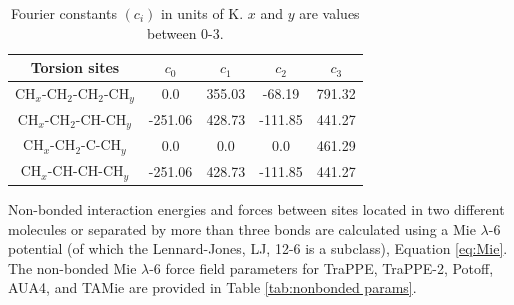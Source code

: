 \documentclass[preprint,review,12pt]{elsarticle}
\begin{document}
\begin{table}[h!]
	\caption{Fourier constants $(c_i)$ in units of K. $x$ and $y$ are values between 0-3.} \label{tab:torsions}
	\begin{center}
		\begin{tabular}{|c|c|c|c|c|}
			\hline
			Torsion sites & $c_0$ & $c_1$ & $c_2$ & $c_3$ \\ \hline
			CH$_x$-CH$_2$-CH$_2$-CH$_y$ & 0.0 & 355.03 & -68.19 & 791.32 \\ 
			CH$_x$-CH$_2$-CH-CH$_y$ & -251.06 & 428.73 & -111.85 & 441.27 \\
			CH$_x$-CH$_2$-C-CH$_y$ & 0.0 & 0.0 & 0.0 & 461.29 \\
			CH$_x$-CH-CH-CH$_y$ & -251.06 & 428.73 & -111.85 & 441.27 \\
			\hline
		\end{tabular}
	\end{center} 
\end{table}
Non-bonded interaction energies and forces between sites located in two different molecules or separated by more than three bonds are calculated using a Mie $\lambda$-6 potential (of which the Lennard-Jones, LJ, 12-6 is a subclass), Equation \ref{eq:Mie}. The non-bonded Mie $\lambda$-6 force field parameters for TraPPE, TraPPE-2, Potoff, AUA4, and TAMie are provided in Table \ref{tab:nonbonded params}. 
\end{document}
